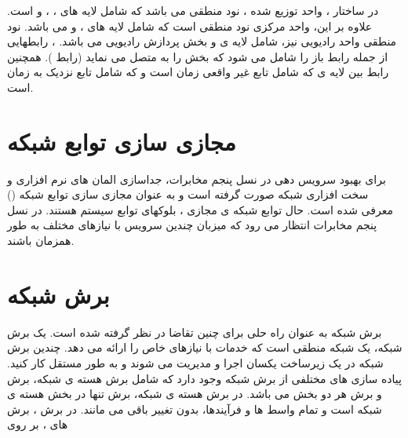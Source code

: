 در ساختار
،
واحد توزیع شده ،
نود منطقی می باشد که شامل لایه های 
،
،
و
است.
علاوه بر این، واحد مرکزی 
نود منطقی است که شامل لایه های 
،
و 
می باشد.
نود منطقی واحد رادیویی
نیز، شامل لایه ی 
و بخش پردازش رادیویی می باشد.
،
رابطهایی از جمله رابط 
باز را شامل می شود که بخش  را به  متصل می نماید
(رابط 
). 
همچنین
 رابط 
 بین لایه ی 
  که شامل 
  تابع غیر واقعی زمان است و 
  که شامل تابع نزدیک به زمان است. 
\section{مجازی سازی توابع شبکه}
برای بهبود سرویس دهی در نسل پنجم مخابرات، جداسازی المان های نرم افزاری و سخت افزاری شبکه صورت گرفته است و به عنوان 
مجازی سازی توابع شبکه () 
معرفی شده است.
  حال توابع شبکه ی مجازی
   ،
  بلوکهای توابع سیستم هستند.
در نسل پنجم مخابرات 
  انتظار می رود که
   میزبان چندین سرویس
   با نیازهای مختلف به طور همزمان
    باشند.
 \section{برش شبکه}
 برش شبکه
به عنوان راه حلی برای چنین تقاضا در نظر گرفته شده است.
یک برش شبکه، یک شبکه منطقی  است که خدمات  با نیازهای خاص را ارائه می دهد.
 چندین برش شبکه
در یک زیرساخت یکسان
  اجرا و مدیریت می شوند و
به طور مستقل کار کنید.
پیاده سازی های مختلفی از برش شبکه وجود دارد که شامل برش هسته ی شبکه، برش  و برش هر دو بخش می باشد.
در برش هسته ی شبکه، برش تنها در بخش هسته ی شبکه است و تمام واسط ها و فرآیندها، بدون تغییر باقی می مانند.
در برش ، 
برش های ، بر روی   